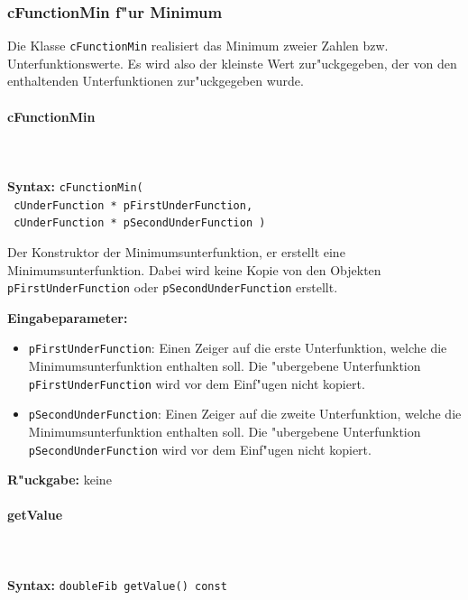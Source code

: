 \subsubsection{cFunctionMin f"ur Minimum}

Die Klasse \verb|cFunctionMin| realisiert das Minimum zweier Zahlen bzw. Unterfunktionswerte. Es wird also der kleinste Wert zur"uckgegeben, der von den enthaltenden Unterfunktionen zur"uckgegeben wurde.

\paragraph{cFunctionMin}

\ \\\\\noindent
\textbf{Syntax:} \verb|cFunctionMin(| \\\verb| cUnderFunction * pFirstUnderFunction,| \\\verb| cUnderFunction * pSecondUnderFunction )|

\bigskip\noindent
Der Konstruktor der Minimumsunterfunktion, er erstellt eine Minimumsunterfunktion. Dabei wird keine Kopie von den Objekten \verb|pFirstUnderFunction| oder \verb|pSecondUnderFunction| erstellt.

\bigskip\noindent
\textbf{Eingabeparameter:}
\begin{itemize}
 \item \verb|pFirstUnderFunction|: Einen Zeiger auf die erste Unterfunktion, welche die Minimumsunterfunktion enthalten soll. Die "ubergebene Unterfunktion \verb|pFirstUnderFunction| wird vor dem Einf"ugen nicht kopiert.
 \item \verb|pSecondUnderFunction|: Einen Zeiger auf die zweite Unterfunktion, welche die Minimumsunterfunktion enthalten soll. Die "ubergebene Unterfunktion \verb|pSecondUnderFunction| wird vor dem Einf"ugen nicht kopiert.
\end{itemize}

\bigskip\noindent
\textbf{R"uckgabe:} keine


\paragraph{getValue}

\ \\\\\noindent
\textbf{Syntax:} \verb|doubleFib getValue() const|

